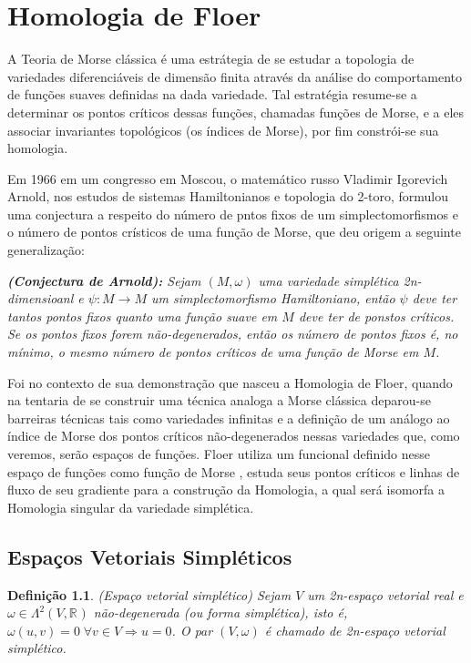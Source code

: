 \documentclass[12pt]{book}
\newtheorem{definicao}[teorema]{Definição}
\newcommand{\real}[1]{\mathbb{R}^{#1}}
\begin{document}
	\chapter{Homologia de Floer}
	A Teoria de Morse clássica é uma estrátegia de se estudar a topologia de variedades diferenciáveis de dimensão finita através da análise do comportamento de funções suaves definidas na dada variedade. Tal estratégia resume-se a determinar os pontos críticos dessas funções, chamadas funções de Morse, e a eles associar invariantes topológicos (os índices de Morse), por fim constrói-se sua homologia.
	
	Em 1966 em um congresso em Moscou, o matemático russo Vladimir Igorevich Arnold, nos estudos de sistemas Hamiltonianos e topologia do 2-toro, formulou uma conjectura a respeito do número de pntos fixos de um simplectomorfismos e o número de pontos crísticos de uma função de Morse, que deu origem a seguinte generalização:
	
	\textit{\textbf{(Conjectura de Arnold):} Sejam $(M, \omega)$ uma variedade simplética 2n-dimensioanl e $\psi : M \to M $ um simplectomorfismo Hamiltoniano, então $\psi$ deve ter tantos pontos fixos quanto uma função suave em $M$ deve ter de ponstos críticos. Se os pontos fixos forem não-degenerados, então os número de pontos fixos é, no mínimo, o mesmo número de pontos críticos de uma função de Morse em $M$.}
	
	Foi no contexto de sua demonstração que nasceu a Homologia de Floer, quando na tentaria de se construir uma técnica analoga a  Morse clássica deparou-se barreiras técnicas tais como variedades infinitas e a definição de um análogo ao índice de Morse dos pontos críticos não-degenerados nessas variedades que, como veremos, serão espaços de funções. Floer utiliza um funcional definido nesse espaço de funções como função de Morse , estuda seus pontos críticos e linhas de fluxo de seu gradiente para a construção da Homologia, a qual será isomorfa a Homologia singular da variedade simplética.
	
	\section{Espaços Vetoriais Simpléticos}
	\begin{definicao}
		(Espaço vetorial simplético) Sejam $V$ um 2n-espaço vetorial real e $\omega \in \Lambda^{2}(V, \real{})$ não-degenerada (ou forma simplética), isto é, $\omega(u,v) = 0 \; \forall v \in V \Rightarrow u=0$. O par $(V, \omega)$ é chamado de 2n-espaço vetorial simplético.
	\end{definicao}
	
\end{document}
